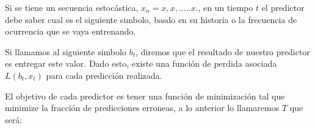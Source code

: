 Si se tiene un secuencia estocástica, $x_{n} = x , x ,.....x .  $, en un tiempo $t$ el predictor debe saber cual es el siguiente simbolo, basdo en su historia o la frecuencia de ocurrencia que se vaya entrenando.

Si llamamos al siguiente simbolo $b_{t}$, diremos que el resultado de nuestro predictor es entregar este valor. Dado esto, existe una función de perdida asociada $L( b_{t},x_{t} )$ para cada predicción realizada. 

El objetivo de cada predictor es tener una función de minimización tal que minimize la fracción de predicciones erroneas, a lo anterior lo llamaremos $T$ que será:










